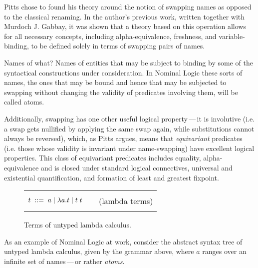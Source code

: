 \documentclass[english, mgr]{iithesis}
\renewcommand{\it}[1]{\textit{#1}}
\newcommand{\mdash}{\,---\,}
\def\-{{\mdash}}
\begin{document}
Pitts chose to found his theory around the notion of swapping names
as opposed to the classical renaming.
In the author's previous work\cite{abstract-syntax-variable-binding}, written together with Murdoch J. Gabbay,
it was shown that a theory based on this operation allows for all necessary concepts,
including alpha-equivalence, freshness, and variable-binding,
to be defined solely in terms of swapping pairs of names.

\begin{mdframed}[frametitle={\textnormal{\footnotesize \textbf{\citeauthor{nominal-logic}}, \textit{\citetitle{nominal-logic}}\cite{nominal-logic}:}}]
Names of what? Names of entities that may be subject to binding by some of
the syntactical constructions under consideration. In Nominal Logic these sorts of
names, the ones that may be bound and hence that may be subjected to swapping
without changing the validity of predicates involving them, will be called atoms.
\end{mdframed}

Additionally, swapping has one other useful logical property\-it is involutive
(i.e. a swap gets nullified by applying the same swap again, while substitutions cannot always be reversed),
which, as Pitts argues, means that \it{equivariant} predicates
(i.e. those whose validity is invariant under name-swapping)
have excellent logical properties.
This class of equivariant predicates includes equality, alpha-equivalence and is
closed under standard logical connectives, universal and existential quantification,
and formation of least and greatest fixpoint.

\begin{figure}[htbp]
  \centering
  \begin{tabularx}{\textwidth}{|CXr|}
      \hline & & \\
  $ t \; ::= \; a \mid \lambda a . t \mid t\;t $
  & & (lambda terms)
  \\ & & \\ \hline
\end{tabularx}
  \caption{Terms of untyped lambda calculus.}
  \label{fig:lambda-calculus}
\end{figure}
As an example of Nominal Logic at work, consider the abstract syntax tree of untyped lambda calculus,
given by the grammar above, where $a$ ranges over an infinite set of names\-or rather \it{atoms}.
\end{document}
